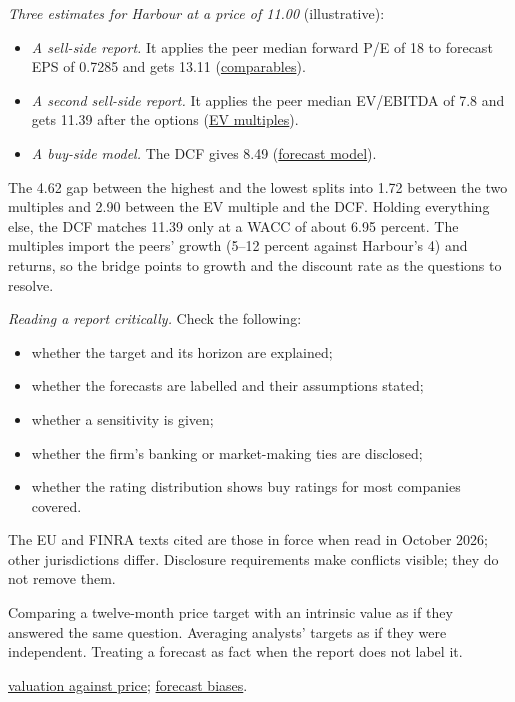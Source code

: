 \begin{qfdefinition}
 \emph{Three estimates for Harbour at a price of 11.00} (illustrative):
\begin{itemize}
\item \emph{A sell-side report.} It applies the peer median forward P/E of 18 to forecast EPS of 0.7285 and gets 13.11 (\hyperref[meth:comparables-evaluation]{comparables}).
\item \emph{A second sell-side report.} It applies the peer median EV/EBITDA of 7.8 and gets 11.39 after the options (\hyperref[meth:enterprise-value-multiples]{EV multiples}).
\item \emph{A buy-side model.} The DCF gives 8.49 (\hyperref[meth:forecast-model-valuation]{forecast model}).
\end{itemize}
The 4.62 gap between the highest and the lowest splits into 1.72 between the two multiples and 2.90 between the EV multiple and the DCF. Holding everything else, the DCF matches 11.39 only at a WACC of about 6.95 percent. The multiples import the peers' growth (5--12 percent against Harbour's 4) and returns, so the bridge points to growth and the discount rate as the questions to resolve.

\emph{Reading a report critically.} Check the following:
\begin{itemize}
\item whether the target and its horizon are explained;
\item whether the forecasts are labelled and their assumptions stated;
\item whether a sensitivity is given;
\item whether the firm's banking or market-making ties are disclosed;
\item whether the rating distribution shows buy ratings for most companies covered.
\end{itemize}

 The EU and FINRA texts cited are those in force when read in October 2026; other jurisdictions differ. Disclosure requirements make conflicts visible; they do not remove them.

 Comparing a twelve-month price target with an intrinsic value as if they answered the same question. Averaging analysts' targets as if they were independent. Treating a forecast as fact when the report does not label it.

 \hyperref[meth:valuation-price-judgement]{valuation against price}; \hyperref[meth:forecast-biases-remedies]{forecast biases}.

\end{qfdefinition}
